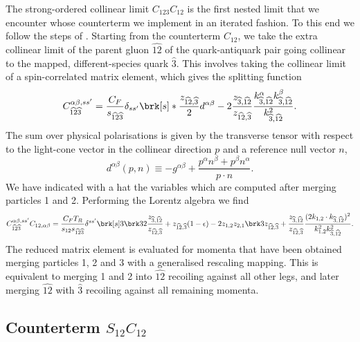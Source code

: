 \documentclass[11pt,a4paper]{article}
\newcommand{\eps}[0]{\epsilon}
\newcommand{\mgd}[1]{\widehat{#1}}
\begin{document}
The strong-ordered collinear limit $C_{123}C_{12}$ is the first nested limit
that we encounter whose counterterm we implement in an iterated fashion.
To this end we follow the steps of \cite{Somogyi:2006da}.
Starting from the counterterm $C_{12}$, we take the extra collinear limit
of the parent gluon $\mgd{12}$ of the quark-antiquark pair
going collinear to the mapped, different-species quark $\mgd{3}$.
This involves taking the collinear limit of a spin-correlated matrix element,
which gives the splitting function
\begin{equation}
	C_{\mgd{12}\mgd{3}}^{\alpha\beta,ss'} = \frac{C_F}{s_{\mgd{12}\mgd{3}}}
	\delta_{ss'} \brk[s]*{
		\frac{z_{\mgd{12},\mgd{3}}}{2} d^{\alpha\beta}
		- 2 \frac{z_{\mgd{3},\mgd{12}}}{z_{\mgd{12},\mgd{3}}}
		\frac{k_{\mgd{3},\mgd{12}}^\alpha k_{\mgd{3},\mgd{12}}^\beta}
		{k_{\mgd{3},\mgd{12}}^2}
	}.
\end{equation}
The sum over physical polarisations is given by the transverse tensor
with respect to the light-cone vector in the collinear direction $p$
and a reference null vector $n$,
\begin{equation}
	d^{\alpha\beta}(p, n) \equiv
	-g^{\alpha\beta}
	+ \frac{p^\alpha n^\beta + p^\beta n^\alpha}{p \cdot n}.
\end{equation}
We have indicated with a hat the variables which are computed
after merging particles 1 and 2.
Performing the Lorentz algebra we find
\begin{equation}
\label{eq:iterC123C12qq}
	C_{\mgd{12}\mgd{3}}^{\alpha\beta,ss'} C_{12,\alpha\beta}
	= \frac{C_FT_R}{s_{12}s_{\mgd{12}\mgd{3}}} \delta^{ss'} \brk[s]3{
		\brk3{
			2 \frac{z_{\mgd{3},\mgd{12}}}{z_{\mgd{12},\mgd{3}}}+
			z_{\mgd{12},\mgd{3}} (1 - \eps)
		} - 2 z_{1,2} z_{2,1} \brk3{
			z_{\mgd{12},\mgd{3}} +
			\frac{z_{\mgd{3},\mgd{12}}}{z_{\mgd{12},\mgd{3}}}
			\frac{(2k_{1,2}\cdot k_{\mgd{3},\mgd{12}})^2}
			{k_{1,2}^2 k_{\mgd{3},\mgd{12}}^2}
		}
	}.
\end{equation}
The reduced matrix element is evaluated for momenta that have been obtained
merging particles 1, 2 and 3 with a generalised rescaling mapping.
This is equivalent to merging 1 and 2 into $\mgd{12}$
recoiling against all other legs,
and later merging $\mgd{12}$ with $\mgd{3}$
recoiling against all remaining momenta.


\subsection{Counterterm $S_{12}C_{12}$}
\end{document}
